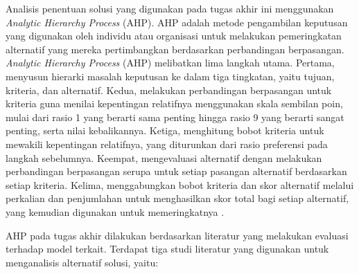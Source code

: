 Analisis penentuan solusi yang digunakan pada tugas akhir ini menggunakan \textit{Analytic Hierarchy Process} (AHP). AHP adalah metode pengambilan keputusan yang digunakan oleh individu atau organisasi untuk melakukan pemeringkatan alternatif yang mereka pertimbangkan berdasarkan perbandingan berpasangan. \textit{Analytic Hierarchy Process} (AHP) melibatkan lima langkah utama. Pertama, menyusun hierarki masalah keputusan ke dalam tiga tingkatan, yaitu tujuan, kriteria, dan alternatif. Kedua, melakukan perbandingan berpasangan untuk kriteria guna menilai kepentingan relatifnya menggunakan skala sembilan poin, mulai dari rasio 1 yang berarti sama penting hingga rasio 9 yang berarti sangat penting, serta nilai kebalikannya. Ketiga, menghitung bobot kriteria untuk mewakili kepentingan relatifnya, yang diturunkan dari rasio preferensi pada langkah sebelumnya. Keempat, mengevaluasi alternatif dengan melakukan perbandingan berpasangan serupa untuk setiap pasangan alternatif berdasarkan setiap kriteria. Kelima, menggabungkan bobot kriteria dan skor alternatif melalui perkalian dan penjumlahan untuk menghasilkan skor total bagi setiap alternatif, yang kemudian digunakan untuk memeringkatnya \autocite{1000minds2025ahp}.

AHP pada tugas akhir dilakukan berdasarkan literatur yang melakukan evaluasi terhadap model terkait. Terdapat tiga studi literatur yang digunakan untuk menganalisis alternatif solusi, yaitu:

